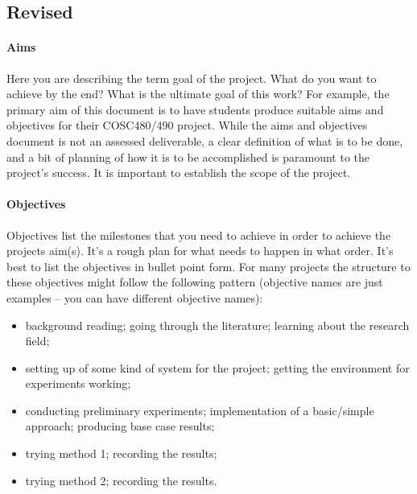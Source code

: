 \documentclass[12pt]{article}
\begin{document}
\subsection*{Revised}

\paragraph{Aims}
Here you are describing the term goal of the project. What do you want to achieve by the end?  What is the ultimate goal of this work?  For example, the primary aim of this document is to have students produce suitable aims and objectives for their COSC480/490 project. While the aims and objectives document is not an assessed deliverable, a clear definition of what is to be done, and a bit of planning of how it is to be accomplished is paramount to the project's success. It is important to establish the scope of the project.

\paragraph{Objectives}
Objectives list the milestones that you need to achieve in order to achieve the projects aim(s). It's a rough plan for what needs to happen in what order. It's best to list the objectives in bullet point form. For many projects the structure to these objectives might follow the following pattern (objective names are just examples -- you can have different objective names):    
\begin{itemize}[noitemsep]
\item background reading; going through the literature; learning about the research field;
\item setting up of some kind of system for the project; getting the environment for experiments working;
\item conducting preliminary experiments; implementation of a basic/simple approach; producing base case results;
\item trying method 1; recording the results;
\item trying method 2; recording the results.
\end{itemize}
\end{document}
